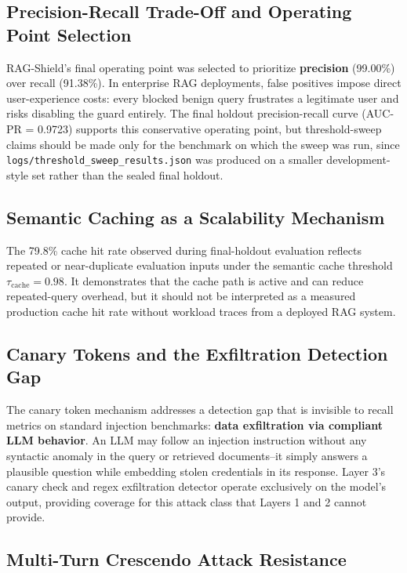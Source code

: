 \documentclass[conference]{IEEEtran}
\begin{document}
\subsection{Precision-Recall Trade-Off and Operating Point Selection}

RAG-Shield's final operating point was selected to prioritize \textbf{precision} (99.00\%) over recall (91.38\%). In enterprise RAG deployments, false positives impose direct user-experience costs: every blocked benign query frustrates a legitimate user and risks disabling the guard entirely. The final holdout precision-recall curve (AUC-PR = 0.9723) supports this conservative operating point, but threshold-sweep claims should be made only for the benchmark on which the sweep was run, since \texttt{logs/threshold\_sweep\_results.json} was produced on a smaller development-style set rather than the sealed final holdout.


\subsection{Semantic Caching as a Scalability Mechanism}

The 79.8\% cache hit rate observed during final-holdout evaluation reflects repeated or near-duplicate evaluation inputs under the semantic cache threshold $\tau_{\text{cache}} = 0.98$. It demonstrates that the cache path is active and can reduce repeated-query overhead, but it should not be interpreted as a measured production cache hit rate without workload traces from a deployed RAG system.


\subsection{Canary Tokens and the Exfiltration Detection Gap}

The canary token mechanism addresses a detection gap that is invisible to recall metrics on standard injection benchmarks: \textbf{data exfiltration via compliant LLM behavior}. An LLM may follow an injection instruction without any syntactic anomaly in the query or retrieved documents--it simply answers a plausible question while embedding stolen credentials in its response. Layer 3's canary check and regex exfiltration detector operate exclusively on the model's output, providing coverage for this attack class that Layers 1 and 2 cannot provide.


\subsection{Multi-Turn Crescendo Attack Resistance}
\end{document}
